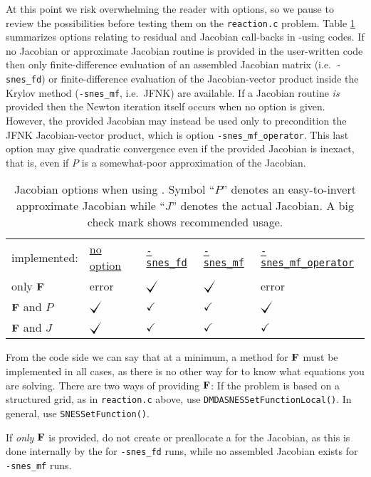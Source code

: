At this point we risk overwhelming the reader with options, so we pause to review the possibilities before testing them on the \texttt{reaction.c} problem.  Table \ref{tab:snesjacobianoptions} summarizes options relating to residual and Jacobian call-backs in \pSNES-using codes.  If no Jacobian or approximate Jacobian routine is provided in the user-written code then only finite-difference evaluation of an assembled Jacobian matrix (i.e.~\texttt{-snes\_fd}) or finite-difference evaluation of the Jacobian-vector product inside the Krylov method (\texttt{-snes\_mf}, i.e.~JFNK) are available.  If a Jacobian routine \emph{is} provided then the Newton iteration itself occurs when no option is given.  However, the provided Jacobian may instead be used only to precondition the JFNK Jacobian-vector product, which is option \texttt{-snes\_mf\_operator}.  This last option may give quadratic convergence even if the provided Jacobian is inexact, that is, even if $P$ is a somewhat-poor approximation of the Jacobian.

\begin{table}
\begin{tabular}{lllll}
implemented: &\underline{no option}\hspace{0.0in} & \underline{\texttt{-snes\_fd}} & \underline{\texttt{-snes\_mf}} & \underline{\texttt{-snes\_mf\_operator}} \\
only $\mathbf{F}$      & error           & $\bigcheckmark$ & $\bigcheckmark$ & error \\
$\mathbf{F}$ and $P$   & $\bigcheckmark$ & $\checkmark$    & $\checkmark$    & $\bigcheckmark$ \\
$\mathbf{F}$ and $J$   & $\bigcheckmark$ & $\checkmark$    & $\checkmark$    & $\checkmark$
\end{tabular}
\caption{Jacobian options when using \pSNES.  Symbol ``$P$'' denotes an easy-to-invert approximate Jacobian while ``$J$'' denotes the actual Jacobian.  A big check mark shows recommended usage.} \label{tab:snesjacobianoptions}
\end{table}

From the code side we can say that at a minimum, a method for $\mathbf{F}$ must be implemented in all cases, as there is no other way for \PETSc to know what equations you are solving.  There are two ways of providing $\mathbf{F}$:  If the problem is based on a structured grid, as in \texttt{reaction.c} above, use \texttt{DMDASNESSetFunctionLocal()}.  In general, use \texttt{SNESSetFunction()}.

If \emph{only} $\mathbf{F}$ is provided, do not create or preallocate a \pMat for the Jacobian, as this is done internally by the \pSNES for \texttt{-snes\_fd} runs, while no assembled Jacobian \pMat exists for \texttt{-snes\_mf} runs.

